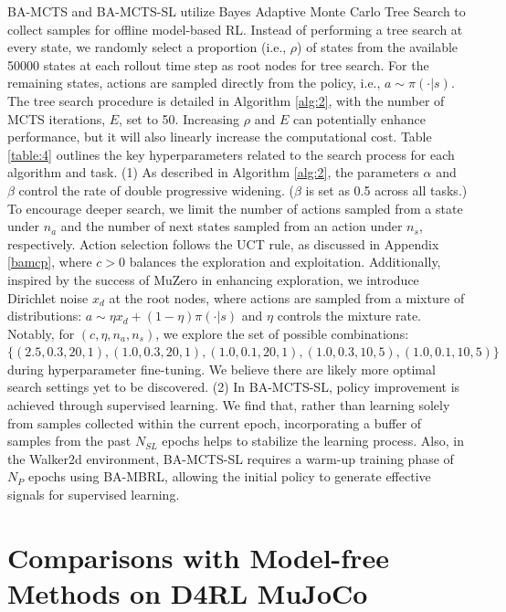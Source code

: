 BA-MCTS and BA-MCTS-SL utilize Bayes Adaptive Monte Carlo Tree Search to collect samples for offline model-based RL. Instead of performing a tree search at every state, we randomly select a proportion (i.e., $\rho$) of states from the available 50000 states at each rollout time step as root nodes for tree search.  For the remaining states, actions are sampled directly from the policy, i.e., $a \sim \pi(\cdot|s)$. The tree search procedure is detailed in Algorithm \ref{alg:2}, with the number of MCTS iterations, $E$, set to 50. Increasing $\rho$ and $E$ can potentially enhance performance, but it will also linearly increase the computational cost. Table \ref{table:4} outlines the key hyperparameters related to the search process for each algorithm and task. (1) As described in Algorithm \ref{alg:2}, the parameters $\alpha$ and $\beta$ control the rate of double progressive widening. ($\beta$ is set as 0.5 across all tasks.) To encourage deeper search, we limit the number of actions sampled from a state under $n_a$ and the number of next states sampled from an action under $n_s$, respectively. Action selection follows the UCT rule, as discussed in Appendix \ref{bamcp}, where $c > 0$ balances the exploration and exploitation. Additionally, inspired by the success of MuZero in enhancing exploration, we introduce Dirichlet noise $x_d$ at the root nodes, where actions are sampled from a mixture of distributions: $a \sim \eta x_d + (1-\eta) \pi(\cdot|s)$ and $\eta$ controls the mixture rate. Notably, for $(c, \eta, n_a, n_s)$, we explore the set of possible combinations: $\{(2.5, 0.3, 20, 1), (1.0, 0.3, 20, 1), (1.0, 0.1, 20, 1), (1.0, 0.3, 10, 5), (1.0, 0.1, 10, 5)\}$ during hyperparameter fine-tuning. We believe there are likely more optimal search settings yet to be discovered. (2) In BA-MCTS-SL, policy improvement is achieved through supervised learning. We find that, rather than learning solely from samples collected within the current epoch, incorporating a buffer of samples from the past $N_{SL}$ epochs helps to stabilize the learning process. Also, in the Walker2d environment, BA-MCTS-SL requires a warm-up training phase of $N_{P}$ epochs using BA-MBRL, allowing the initial policy to generate effective signals for supervised learning. 



\section{Comparisons with Model-free Methods on D4RL MuJoCo} \label{ComMF}

